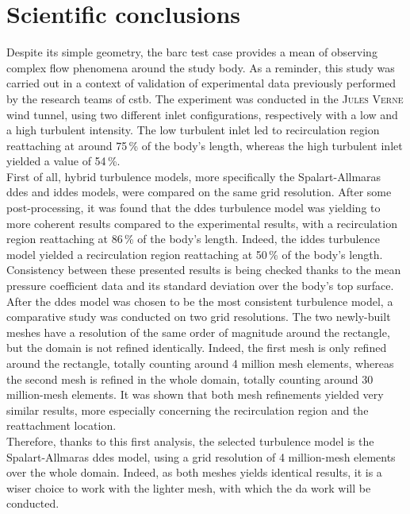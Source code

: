 \documentclass[12pt,twoside]{report}
\begin{document}
\section{Scientific conclusions}

Despite its simple geometry, the \gls{barc} test case provides a mean of observing complex flow phenomena around the study body. As a reminder, this study was carried out in a context of validation of experimental data previously performed by the research teams of \gls{cstb}. The experiment was conducted in the \textsc{Jules Verne} wind tunnel, using two different inlet configurations, respectively with a low and a high turbulent intensity. The low turbulent inlet led to recirculation region reattaching at around 75\,\% of the body's length, whereas the high turbulent inlet yielded a value of 54\,\%.\\

First of all, hybrid turbulence models, more specifically the Spalart-Allmaras \gls{ddes} and \gls{iddes} models, were compared on the same grid resolution. After some post-processing, it was found that the \gls{ddes} turbulence model was yielding to more coherent results compared to the experimental results, with a recirculation region reattaching at 86\,\% of the body's length. Indeed, the \gls{iddes} turbulence model yielded a recirculation region reattaching at 50\,\% of the body's length. Consistency between these presented results is being checked thanks to the mean pressure coefficient data and its standard deviation over the body's top surface. \\
After the \gls{ddes} model was chosen to be the most consistent turbulence model, a comparative study was conducted on two grid resolutions. The two newly-built meshes have a resolution of the same order of magnitude around the rectangle, but the domain is not refined identically. Indeed, the first mesh is only refined around the rectangle, totally counting around 4 million mesh elements, whereas the second mesh is refined in the whole domain, totally counting around 30 million-mesh elements. It was shown that both mesh refinements yielded very similar results, more especially concerning the recirculation region and the reattachment location. \\
Therefore, thanks to this first analysis, the selected turbulence model is the Spalart-Allmaras \gls{ddes} model, using a grid resolution of 4 million-mesh elements over the whole domain. Indeed, as both meshes yields identical results, it is a wiser choice to work with the lighter mesh, with which the \gls{da} work will be conducted.
\end{document}
